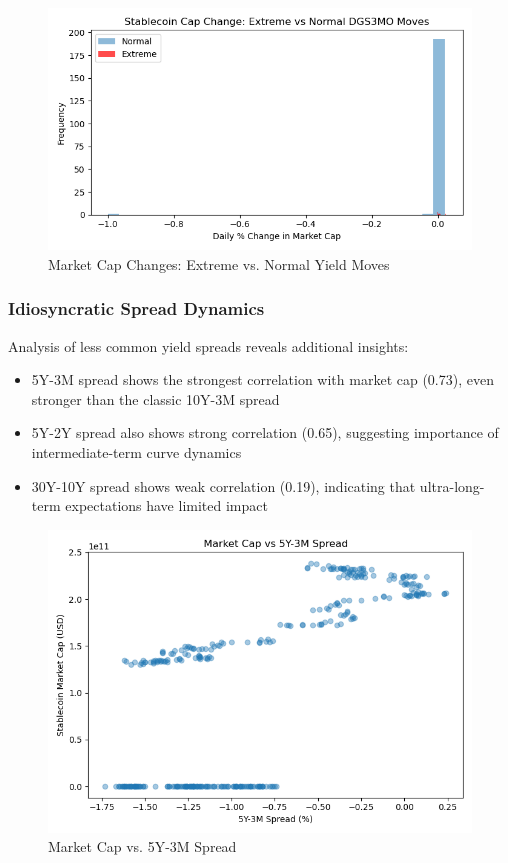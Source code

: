 \documentclass[12pt,a4paper]{article}
\begin{document}
\begin{figure}[H]
    \centering
    \includegraphics[width=\columnwidth]{figures/extreme_event_marketcap_DGS3MO.png}
    \caption{Market Cap Changes: Extreme vs. Normal Yield Moves}
    \label{fig:extreme}
\end{figure}

\subsubsection{Idiosyncratic Spread Dynamics}
Analysis of less common yield spreads reveals additional insights:
\begin{itemize}
    \item 5Y-3M spread shows the strongest correlation with market cap (0.73), even stronger than the classic 10Y-3M spread
    \item 5Y-2Y spread also shows strong correlation (0.65), suggesting importance of intermediate-term curve dynamics
    \item 30Y-10Y spread shows weak correlation (0.19), indicating that ultra-long-term expectations have limited impact
\end{itemize}

\begin{figure}[H]
    \centering
    \includegraphics[width=\columnwidth]{figures/marketcap_vs_5Y-3M.png}
    \caption{Market Cap vs. 5Y-3M Spread}
    \label{fig:idiosyncratic}
\end{figure}
\end{document}
